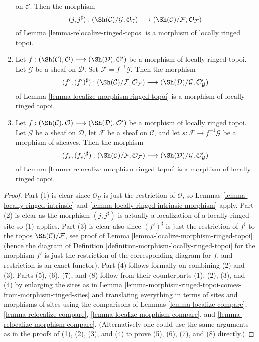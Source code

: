 \begin{lemma}
\begin{enumerate}
on $\mathcal{C}$. Then the morphism
$$
(j, j^\sharp) :
(\Sh(\mathcal{C})/\mathcal{G}, \mathcal{O}_\mathcal{G})
\longrightarrow
(\Sh(\mathcal{C})/\mathcal{F}, \mathcal{O}_\mathcal{F})
$$
of
Lemma \ref{lemma-relocalize-ringed-topos}
is a morphism of locally ringed topoi.
\item Let
$f :
(\Sh(\mathcal{C}), \mathcal{O})
\longrightarrow
(\Sh(\mathcal{D}), \mathcal{O}')$
be a morphism of locally ringed topoi. Let $\mathcal{G}$ be a sheaf
on $\mathcal{D}$. Set $\mathcal{F} = f^{-1}\mathcal{G}$.
Then the morphism
$$
(f', (f')^\sharp) :
(\Sh(\mathcal{C})/\mathcal{F}, \mathcal{O}_\mathcal{F})
\longrightarrow
(\Sh(\mathcal{D})/\mathcal{G}, \mathcal{O}'_\mathcal{G})
$$
of
Lemma \ref{lemma-localize-morphism-ringed-topoi}
is a morphism of locally ringed topoi.
\item  Let
$f :
(\Sh(\mathcal{C}), \mathcal{O})
\longrightarrow
(\Sh(\mathcal{D}), \mathcal{O}')$
be a morphism of locally ringed topoi. Let $\mathcal{G}$ be a sheaf
on $\mathcal{D}$, let $\mathcal{F}$ be a sheaf on $\mathcal{C}$, and
let $s : \mathcal{F} \to f^{-1}\mathcal{G}$ be a morphism of sheaves.
Then the morphism
$$
(f_s, (f_s)^\sharp) :
(\Sh(\mathcal{C})/\mathcal{F}, \mathcal{O}_\mathcal{F})
\longrightarrow
(\Sh(\mathcal{D})/\mathcal{G}, \mathcal{O}'_\mathcal{G})
$$
of
Lemma \ref{lemma-relocalize-morphism-ringed-topoi}
is a morphism of locally ringed topoi.
\end{enumerate}
\end{lemma}

\begin{proof}
Part (1) is clear since $\mathcal{O}_U$ is just the
restriction of $\mathcal{O}$, so
Lemmas \ref{lemma-locally-ringed-intrinsic} and
\ref{lemma-locally-ringed-intrinsic-morphism}
apply. Part (2) is clear as the morphism $(j, j^\sharp)$
is actually a localization of a locally ringed site so (1) applies.
Part (3) is clear also since $(f')^\sharp$ is just the
restriction of $f^\sharp$ to the topos
$\Sh(\mathcal{C})/\mathcal{F}$, see proof of
Lemma \ref{lemma-localize-morphism-ringed-topoi}
(hence the diagram of
Definition \ref{definition-morphism-locally-ringed-topoi}
for the morphism $f'$ is just the restriction of the corresponding
diagram for $f$, and restriction is an exact functor).
Part (4) follows formally on combining (2) and (3).
Parts (5), (6), (7), and (8) follow from their counterparts
(1), (2), (3), and (4) by enlarging the sites as in
Lemma \ref{lemma-morphism-ringed-topoi-comes-from-morphism-ringed-sites}
and translating everything in terms of sites and morphisms of sites using
the comparisons of
Lemmas \ref{lemma-localize-compare},
\ref{lemma-relocalize-compare},
\ref{lemma-localize-morphism-compare}, and
\ref{lemma-relocalize-morphism-compare}.
(Alternatively one could use the same arguments as in the proofs
of (1), (2), (3), and (4) to prove (5), (6), (7), and (8) directly.)
\end{proof}






